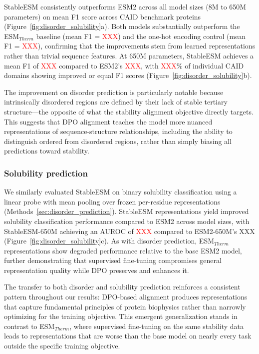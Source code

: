 \documentclass[]{fairmeta}
\begin{document}
StableESM consistently outperforms ESM2 across all model sizes (8M to 650M parameters) on mean F1 score across CAID benchmark proteins (Figure~\ref{fig:disorder_solubility}a). Both models substantially outperform the ESM$_{Therm}$ baseline (mean F1 = \textcolor{red}{XXX}) and the one-hot encoding control (mean F1 = \textcolor{red}{XXX}), confirming that the improvements stem from learned representations rather than trivial sequence features. At 650M parameters, StableESM achieves a mean F1 of \textcolor{red}{XXX} compared to ESM2's \textcolor{red}{XXX}, with \textcolor{red}{XXX}\% of individual CAID domains showing improved or equal F1 scores (Figure~\ref{fig:disorder_solubility}b).

The improvement on disorder prediction is particularly notable because intrinsically disordered regions are defined by their lack of stable tertiary structure—the opposite of what the stability alignment objective directly targets. This suggests that DPO alignment teaches the model more nuanced representations of sequence-structure relationships, including the ability to distinguish ordered from disordered regions, rather than simply biasing all predictions toward stability.

\subsubsection{Solubility prediction}

We similarly evaluated StableESM on binary solubility classification using a linear probe with mean pooling over frozen per-residue representations (Methods~\ref{sec:disorder_prediction}). StableESM representations yield improved solubility classification performance compared to ESM2 across model sizes, with StableESM-650M achieving an AUROC of \textcolor{red}{XXX} compared to ESM2-650M's XXX (Figure~\ref{fig:disorder_solubility}c). As with disorder prediction, ESM$_{Therm}$ representations show degraded performance relative to the base ESM2 model, further demonstrating that supervised fine-tuning compromises general representation quality while DPO preserves and enhances it.

The transfer to both disorder and solubility prediction reinforces a consistent pattern throughout our results: DPO-based alignment produces representations that capture fundamental principles of protein biophysics rather than narrowly optimizing for the training objective. This emergent generalization stands in contrast to ESM$_{Therm}$, where supervised fine-tuning on the same stability data leads to representations that are worse than the base model on nearly every task outside the specific training objective.
\end{document}

